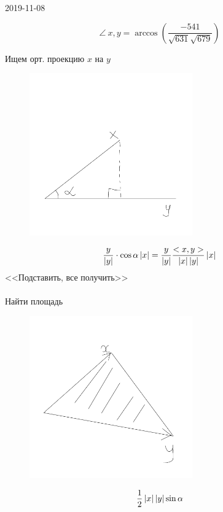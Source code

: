 \documentclass[12pt, fleqn]{article}
\begin{document}
\begin{lect}{2019-11-08}
\begin{Task}[7.1]
        \[\angle \ x, y = \arccos\left
        (\frac{-541}{\sqrt{631}\sqrt{679}}\right)\]

        Ищем орт. проекцию $x$ на $y$
        \begin{figure}[H]
            \includegraphics[width=7cm]{pics/1}
            \centering
        \end{figure}
        
        \[\frac{y}{\left|y\right|}  \cdot \cos \alpha \left|x\right| =  
        \frac{y}{\left|y\right|} \frac{<x, y>}{\left|x\right|\left|y\right|}\left|x\right|\]
        <<Подставить, все получить>>\\
        \\
        Найти площадь
        \begin{figure}[H]
            \includegraphics[width=7cm]{pics/2}
            \centering
        \end{figure}
        \[\frac{1}{2}\left|x\right|\left|y\right|\sin \alpha\]


\end{Task}
\end{lect}
\end{document}
